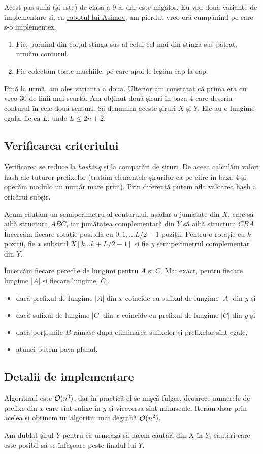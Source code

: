 \documentclass[../main.tex]{subfiles}
\begin{document}
Acest pas sună (și este) de clasa a 9-a, dar este migălos. Eu văd două variante de implementare și, ca \href{https://en.wikipedia.org/wiki/Runaround_(story)}{robotul lui Asimov}, am pierdut vreo oră cumpănind pe care s-o implementez.

\begin{enumerate}
  \item Fie, pornind din colțul stînga-sus al celui cel mai din stînga-sus pătrat, urmăm conturul.
  \item Fie colectăm toate muchiile, pe care apoi le legăm cap la cap.
\end{enumerate}

Pînă la urmă, am ales varianta a doua. Ulterior am constatat că prima era cu vreo 30 de linii mai scurtă.  Am obținut două șiruri în baza 4 care descriu conturul în cele două sensuri. Să denumim aceste șiruri $X$ și $Y$. Ele au o lungime egală, fie ea $L$, unde $L \leq 2n + 2$.

\subsection{Verificarea criteriului}

Verificarea se reduce la \textit{hashing} și la comparări de șiruri. De aceea calculăm valori hash ale tuturor prefixelor (tratăm elementele șirurilor ca pe cifre în baza 4 și operăm modulo un număr mare prim). Prin diferență putem afla valoarea hash a oricărui subșir.

Acum căutăm un semiperimetru al conturului, așadar o jumătate din $X$, care să aibă structura $ABC$, iar jumătatea complementară din $Y$ să aibă structura  $CBA$. Încercăm fiecare rotație posibilă cu $0, 1, \dots L/2-1$ poziții. Pentru o rotație cu $k$ poziții, fie $x$ subșirul $X[k \dots k + L/2 - 1]$ și fie $y$ semiperimetrul complementar din $Y$.

Încercăm fiecare pereche de lungimi pentru $A$ și $C$. Mai exact, pentru fiecare lungime $|A|$ și fiecare lungime $|C|$,

\begin{itemize}
  \item dacă prefixul de lungime $|A|$ din $x$ coincide cu sufixul de lungime $|A|$ din $y$ și
  \item dacă sufixul de lungime $|C|$ din $x$ coincide cu prefixul de lungime $|C|$ din $y$ și
  \item dacă porțiunile $B$ rămase după eliminarea sufixelor și prefixelor sînt egale,
  \item atunci putem pava planul.
\end{itemize}

\subsection{Detalii de implementare}

Algoritmul este $\mathcal{O}(n^3)$, dar în practică el se mișcă fulger, deoarece numerele de prefixe din $x$ care sînt sufixe în $y$ și viceversa sînt minuscule. Iterăm doar prin acelea și obținem un algoritm mai degrabă $\mathcal{O}(n^2)$.

Am dublat șirul $Y$ pentru că urmează să facem căutări din $X$ în $Y$, căutări care este posibil să se înfășoare peste finalul lui $Y$.
\end{document}
